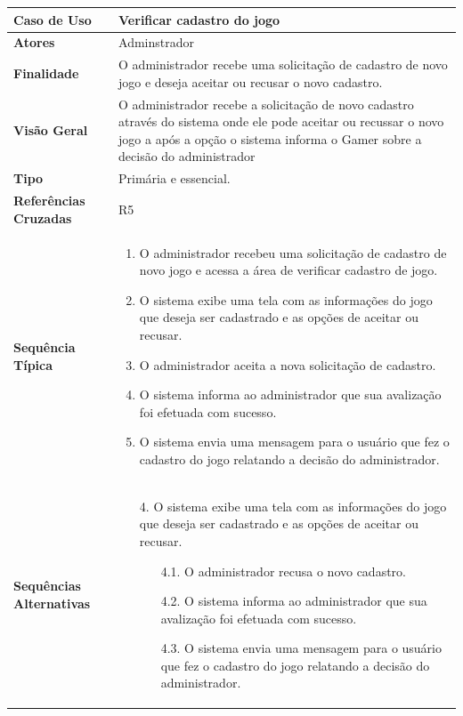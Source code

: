\documentclass[a4paper,11pt]{article}
\begin{document}
\begin{table}[H]
		\begin{tabularx}{\textwidth}{|l|X|}
		\hline
			\textbf{Caso de Uso} &  Verificar cadastro do jogo \\ \hline
			\textbf{Atores} &   Adminstrador \\ \hline
			\textbf{Finalidade} &  O administrador recebe uma solicitação de cadastro de novo jogo e deseja aceitar ou recusar o novo cadastro. \\ \hline
			\textbf{Visão Geral} & O administrador recebe a solicitação de novo cadastro através do sistema onde ele pode aceitar ou recussar o novo jogo a após a opção o sistema informa o Gamer sobre a decisão do administrador  \\ \hline
			\textbf{Tipo} & Primária e essencial. \\ \hline
			\textbf{Referências Cruzadas} & R5 \\ \hline
			\textbf{Sequência Típica} & 
			\begin{enumerate}
			\item O administrador recebeu uma solicitação de cadastro de novo jogo e acessa a área de verificar cadastro de jogo.
			\item O sistema exibe uma tela com as informações do jogo que deseja ser cadastrado e as opções de aceitar ou recusar. 
			\item O administrador aceita a nova solicitação de cadastro.
			\item O sistema informa ao administrador que sua avalização foi efetuada com sucesso.
			\item O sistema envia uma mensagem para o usuário que fez o cadastro do jogo relatando a decisão do administrador.
			\end{enumerate} \\ \hline
			
			\textbf{Sequências Alternativas} & 
			\begin{itemize}
				\item[4.] O sistema exibe uma tela com as informações do jogo que deseja ser cadastrado e as opções de aceitar ou recusar.
				\begin{itemize}
					\item[4.1.] O administrador recusa o novo cadastro.
					\item[4.2.] O sistema informa ao administrador que sua avalização foi efetuada com sucesso.
					\item[4.3.] O sistema envia uma mensagem para o usuário que fez o cadastro do jogo relatando a decisão do administrador.
				\end{itemize}
			\end{itemize} \\ \hline
		\end{tabularx}
\end{table}
\end{document}
